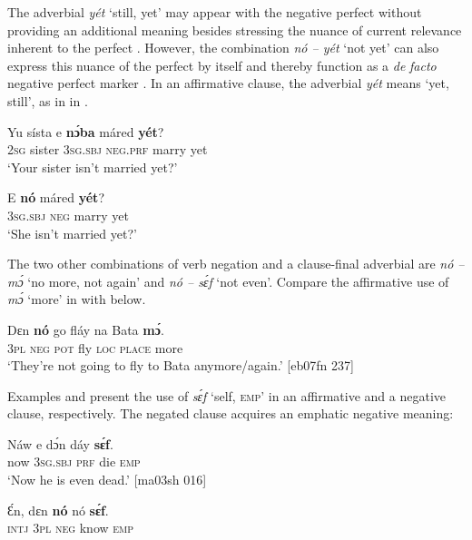 The adverbial \textit{yét} ‘still, yet’ may appear with the negative perfect without providing an additional meaning besides stressing the nuance of current relevance inherent to the perfect . However, the combination \textit{nó -- yét} ‘not yet’ can also express this nuance of the perfect by itself and thereby function as a \textit{de} \textit{facto} negative perfect marker . In an affirmative clause, the adverbial \textit{yét} means ‘yet, still’, as in  in .


\ea%
    \label{ex:key:543}
    \gll Yu  sísta    e    \textbf{nɔ́ba}  máred  \textbf{yét}?\\
\textsc{2sg}  sister  \textsc{3sg.sbj}  \textsc{neg}.\textsc{prf}  marry  yet\\

\glt ‘Your sister isn’t married yet?’
\z


\ea%
    \label{ex:key:544}
    \gll E    \textbf{nó}  máred  \textbf{yét}?\\
\textsc{3sg.sbj}  \textsc{neg}  marry  yet\\

\glt ‘She isn’t married yet?’
\z

The two other combinations of verb negation and a clause-final adverbial are \textit{nó -- mɔ́} ‘no more, not again’ and \textit{nó -- sɛ́f} ‘not even’. Compare the affirmative use of \textit{mɔ́} ‘more’ in  with  below. 


\ea%
    \label{ex:key:545}
    \gll Dɛn  \textbf{nó}  go  fláy  na  Bata    \textbf{mɔ́}.\\
\textsc{3pl}  \textsc{neg}  \textsc{pot}  fly  \textsc{loc}  \textsc{place}  more\\

\glt ‘They’re not going to fly to Bata anymore/again.’ [eb07fn 237]
\z

Examples  and  present the use of \textit{sɛ́f} ‘self, \textsc{emp}’ in an affirmative and a negative clause, respectively. The negated clause acquires an emphatic negative meaning: 


\ea%
    \label{ex:key:546}
    \gll Náw    e    dɔ́n  dáy  \textbf{sɛ́f}.\\
now    \textsc{3sg.sbj}  \textsc{prf}  die  \textsc{emp}\\

\glt ‘Now he is even dead.’ [ma03sh 016]
\z


\ea%
    \label{ex:key:547}
    \gll Ɛ́n,  dɛn  \textbf{nó}  nó    \textbf{sɛ́f}.\\
\textsc{intj}  \textsc{3pl}  \textsc{neg}  know  \textsc{emp}\\


